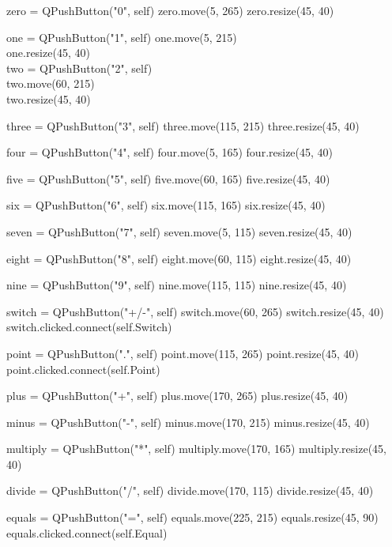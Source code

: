         zero = QPushButton("0", self)
        zero.move(5, 265)
        zero.resize(45, 40)

        one = QPushButton("1", self)
        one.move(5, 215)\\
        one.resize(45, 40)\\

        two = QPushButton("2", self)\\
        two.move(60, 215)\\
        two.resize(45, 40)

        three = QPushButton("3", self)
        three.move(115, 215)
        three.resize(45, 40)

        four = QPushButton("4", self)
        four.move(5, 165)
        four.resize(45, 40)

        five = QPushButton("5", self)
        five.move(60, 165)
        five.resize(45, 40)

        six = QPushButton("6", self)
        six.move(115, 165)
        six.resize(45, 40)

        seven = QPushButton("7", self)
        seven.move(5, 115)
        seven.resize(45, 40)

        eight = QPushButton("8", self)
        eight.move(60, 115)
        eight.resize(45, 40)

        nine = QPushButton("9", self)
        nine.move(115, 115)
        nine.resize(45, 40)

        switch = QPushButton("+/-", self)
        switch.move(60, 265)
        switch.resize(45, 40)
        switch.clicked.connect(self.Switch)

        point = QPushButton(".", self)
        point.move(115, 265)
        point.resize(45, 40)
        point.clicked.connect(self.Point)

        plus = QPushButton("+", self)
        plus.move(170, 265)
        plus.resize(45, 40)

        minus = QPushButton("-", self)
        minus.move(170, 215)
        minus.resize(45, 40)

        multiply = QPushButton("*", self)
        multiply.move(170, 165)
        multiply.resize(45, 40)

        divide = QPushButton("/", self)
        divide.move(170, 115)
        divide.resize(45, 40)

        equals = QPushButton("=", self)
        equals.move(225, 215)
        equals.resize(45, 90)
        equals.clicked.connect(self.Equal)


